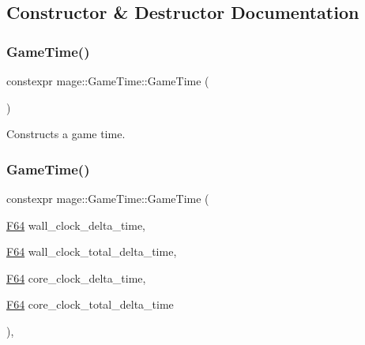 \subsection{Constructor \& Destructor Documentation}
\mbox{\label{classmage_1_1_game_time_af39a4fbd42467249874ba9372f463552}} 
\subsubsection{\texorpdfstring{Game\+Time()}{GameTime()}\hspace{0.1cm}{\footnotesize\ttfamily [1/4]}}
{\footnotesize\ttfamily constexpr mage\+::\+Game\+Time\+::\+Game\+Time (\begin{DoxyParamCaption}{ }\end{DoxyParamCaption})\hspace{0.3cm}{\ttfamily [noexcept]}}

Constructs a game time. \mbox{\label{classmage_1_1_game_time_aaee30f360c0ae8383a16f908fe3abe78}} 
\subsubsection{\texorpdfstring{Game\+Time()}{GameTime()}\hspace{0.1cm}{\footnotesize\ttfamily [2/4]}}
{\footnotesize\ttfamily constexpr mage\+::\+Game\+Time\+::\+Game\+Time (\begin{DoxyParamCaption}\item[{\mbox{\hyperlink{namespacemage_ad26233bbec640deda836e572c1a23708}{F64}}}]{wall\+\_\+clock\+\_\+delta\+\_\+time,  }\item[{\mbox{\hyperlink{namespacemage_ad26233bbec640deda836e572c1a23708}{F64}}}]{wall\+\_\+clock\+\_\+total\+\_\+delta\+\_\+time,  }\item[{\mbox{\hyperlink{namespacemage_ad26233bbec640deda836e572c1a23708}{F64}}}]{core\+\_\+clock\+\_\+delta\+\_\+time,  }\item[{\mbox{\hyperlink{namespacemage_ad26233bbec640deda836e572c1a23708}{F64}}}]{core\+\_\+clock\+\_\+total\+\_\+delta\+\_\+time }\end{DoxyParamCaption})\hspace{0.3cm}{\ttfamily [explicit]}, {\ttfamily [noexcept]}}

